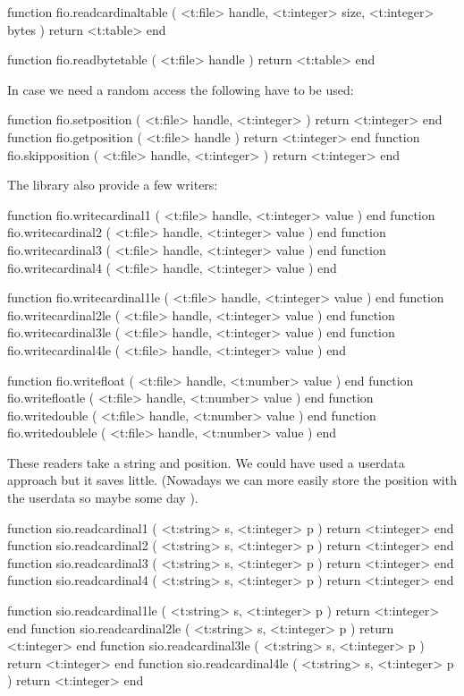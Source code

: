 function fio.readcardinaltable (
    <t:file>    handle,
    <t:integer> size,
    <t:integer> bytes
)
    return <t:table>
end

function fio.readbytetable (
    <t:file> handle
)
    return <t:table>
end
\stoptyping

In case we need a random access the following have to be used:

\starttyping[option=LUA]
function fio.setposition  ( <t:file> handle, <t:integer> ) return <t:integer> end
function fio.getposition  ( <t:file> handle              ) return <t:integer> end
function fio.skipposition ( <t:file> handle, <t:integer> ) return <t:integer> end
\stoptyping

The library also provide a few writers:

\starttyping[option=LUA]
function fio.writecardinal1 ( <t:file> handle, <t:integer> value ) end
function fio.writecardinal2 ( <t:file> handle, <t:integer> value ) end
function fio.writecardinal3 ( <t:file> handle, <t:integer> value ) end
function fio.writecardinal4 ( <t:file> handle, <t:integer> value ) end

function fio.writecardinal1le ( <t:file> handle, <t:integer> value ) end
function fio.writecardinal2le ( <t:file> handle, <t:integer> value ) end
function fio.writecardinal3le ( <t:file> handle, <t:integer> value ) end
function fio.writecardinal4le ( <t:file> handle, <t:integer> value ) end

function fio.writefloat    ( <t:file> handle, <t:number> value ) end
function fio.writefloatle  ( <t:file> handle, <t:number> value ) end
function fio.writedouble   ( <t:file> handle, <t:number> value ) end
function fio.writedoublele ( <t:file> handle, <t:number> value ) end
\stoptyping

\stopsubsection

\startsubsection[title=Reading from a string]

These readers take a string and position. We could have used a userdata approach
but it saves little. (Nowadays we can more easily store the position with the
userdata so maybe some day \unknown).

\starttyping[option=LUA]
function sio.readcardinal1 ( <t:string> s, <t:integer> p ) return <t:integer> end
function sio.readcardinal2 ( <t:string> s, <t:integer> p ) return <t:integer> end
function sio.readcardinal3 ( <t:string> s, <t:integer> p ) return <t:integer> end
function sio.readcardinal4 ( <t:string> s, <t:integer> p ) return <t:integer> end

function sio.readcardinal1le ( <t:string> s, <t:integer> p ) return <t:integer> end
function sio.readcardinal2le ( <t:string> s, <t:integer> p ) return <t:integer> end
function sio.readcardinal3le ( <t:string> s, <t:integer> p ) return <t:integer> end
function sio.readcardinal4le ( <t:string> s, <t:integer> p ) return <t:integer> end

